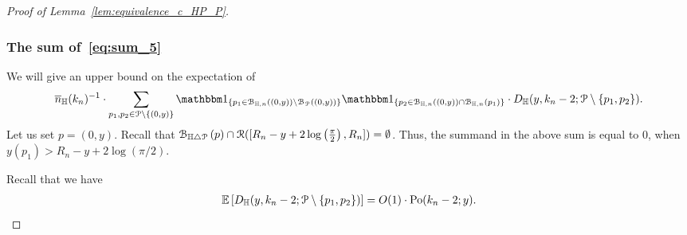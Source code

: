 \begin{proof}[Proof of Lemma~\ref{lem:equivalence_c_HP_P}]
%

\subsubsection{The sum of~\eqref{eq:sum_5}}

We will give an upper bound on the expectation of 
$$\expH^{-1} \cdot \sum_{p_1,p_2\in\Pcal \setminus \{(0,y)\}}\ind{p_1\in \BallHyp{(0,y)} \setminus 
\BallPo{(0,y)}}\ind{p_2 \in \BallHyp{(0,y)}\cap \BallHyp{p_1}} \cdot 
D_\H (y,k_n-2;\Pcal \setminus \{ p_1, p_2\}).$$
Let us set $p=(0,y)$. Recall that $\BallSym{p}\cap \Rcal([R_n - y + 2 \log\left(\frac{\pi}{2}\right),R_n]) = \emptyset$. Thus, the summand in the above sum is equal to 0, when 
$y(p_1) > R_n - y + 2 \log (\pi/2)$. 

Recall that  we have  
\begin{equation} \label{eq:ball_multitude}
\begin{split}
\Exp{D_\H (y,k_n-2;\Pcal \setminus \{ p_1, p_2\})}  =O(1)\cdot   \Pop{y}{k_n-2}.
\end{split}
\end{equation}



\end{proof}
